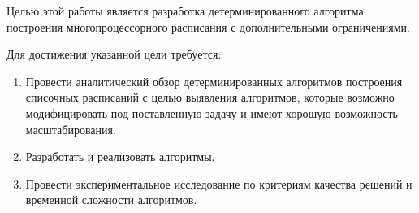 Целью этой работы является разработка детерминированного алгоритма построения многопроцессорного расписания с дополнительными ограничениями.

Для достижения указанной цели требуется:
\begin{enumerate}
    \item Провести аналитический обзор детерминированных алгоритмов построения списочных расписаний с целью выявления алгоритмов, которые возможно модифицировать под поставленную задачу и имеют хорошую возможность масштабирования.
    \item Разработать и реализовать алгоритмы.
    \item Провести экспериментальное исследование по критериям качества решений и временной сложности алгоритмов.
\end{enumerate}